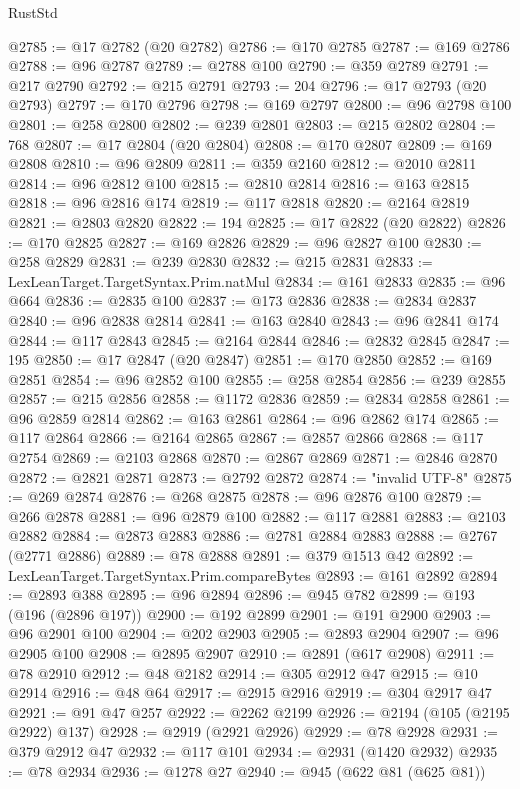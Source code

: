 \begin{lexlean}{RustStd}
\begin{coremodule}
@2785 := @17 @2782 (@20 @2782)
@2786 := @170 @2785
@2787 := @169 @2786
@2788 := @96 @2787
@2789 := @2788 @100
@2790 := @359 @2789
@2791 := @217 @2790
@2792 := @215 @2791
@2793 := 204
@2796 := @17 @2793 (@20 @2793)
@2797 := @170 @2796
@2798 := @169 @2797
@2800 := @96 @2798 @100
@2801 := @258 @2800
@2802 := @239 @2801
@2803 := @215 @2802
@2804 := 768
@2807 := @17 @2804 (@20 @2804)
@2808 := @170 @2807
@2809 := @169 @2808
@2810 := @96 @2809
@2811 := @359 @2160
@2812 := @2010 @2811
@2814 := @96 @2812 @100
@2815 := @2810 @2814
@2816 := @163 @2815
@2818 := @96 @2816 @174
@2819 := @117 @2818
@2820 := @2164 @2819
@2821 := @2803 @2820
@2822 := 194
@2825 := @17 @2822 (@20 @2822)
@2826 := @170 @2825
@2827 := @169 @2826
@2829 := @96 @2827 @100
@2830 := @258 @2829
@2831 := @239 @2830
@2832 := @215 @2831
@2833 := LexLeanTarget.TargetSyntax.Prim.natMul
@2834 := @161 @2833
@2835 := @96 @664
@2836 := @2835 @100
@2837 := @173 @2836
@2838 := @2834 @2837
@2840 := @96 @2838 @2814
@2841 := @163 @2840
@2843 := @96 @2841 @174
@2844 := @117 @2843
@2845 := @2164 @2844
@2846 := @2832 @2845
@2847 := 195
@2850 := @17 @2847 (@20 @2847)
@2851 := @170 @2850
@2852 := @169 @2851
@2854 := @96 @2852 @100
@2855 := @258 @2854
@2856 := @239 @2855
@2857 := @215 @2856
@2858 := @1172 @2836
@2859 := @2834 @2858
@2861 := @96 @2859 @2814
@2862 := @163 @2861
@2864 := @96 @2862 @174
@2865 := @117 @2864
@2866 := @2164 @2865
@2867 := @2857 @2866
@2868 := @117 @2754
@2869 := @2103 @2868
@2870 := @2867 @2869
@2871 := @2846 @2870
@2872 := @2821 @2871
@2873 := @2792 @2872
@2874 := "invalid UTF-8"
@2875 := @269 @2874
@2876 := @268 @2875
@2878 := @96 @2876 @100
@2879 := @266 @2878
@2881 := @96 @2879 @100
@2882 := @117 @2881
@2883 := @2103 @2882
@2884 := @2873 @2883
@2886 := @2781 @2884 @2883
@2888 := @2767 (@2771 @2886)
@2889 := @78 @2888
@2891 := @379 @1513 @42
@2892 := LexLeanTarget.TargetSyntax.Prim.compareBytes
@2893 := @161 @2892
@2894 := @2893 @388
@2895 := @96 @2894
@2896 := @945 @782
@2899 := @193 (@196 (@2896 @197))
@2900 := @192 @2899
@2901 := @191 @2900
@2903 := @96 @2901 @100
@2904 := @202 @2903
@2905 := @2893 @2904
@2907 := @96 @2905 @100
@2908 := @2895 @2907
@2910 := @2891 (@617 @2908)
@2911 := @78 @2910
@2912 := @48 @2182
@2914 := @305 @2912 @47
@2915 := @10 @2914
@2916 := @48 @64
@2917 := @2915 @2916
@2919 := @304 @2917 @47
@2921 := @91 @47 @257
@2922 := @2262 @2199
@2926 := @2194 (@105 (@2195 @2922) @137)
@2928 := @2919 (@2921 @2926)
@2929 := @78 @2928
@2931 := @379 @2912 @47
@2932 := @117 @101
@2934 := @2931 (@1420 @2932)
@2935 := @78 @2934
@2936 := @1278 @27
@2940 := @945 (@622 @81 (@625 @81))

\end{coremodule}
\end{lexlean}

